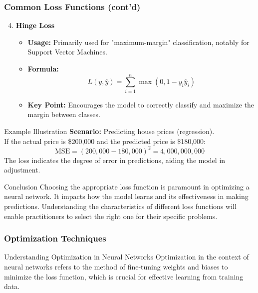 \documentclass[aspectratio=169]{beamer}
\begin{document}
\begin{frame}[fragile]
    \frametitle{Common Loss Functions (cont'd)}
    \begin{enumerate}
        \setcounter{enumi}{3}
        \item \textbf{Hinge Loss}
            \begin{itemize}
                \item \textbf{Usage:} Primarily used for "maximum-margin" classification, notably for Support Vector Machines.
                \item \textbf{Formula:} 
                \begin{equation}
                    L(y, \hat{y}) = \sum_{i=1}^{n} \max(0, 1 - y_i \hat{y}_i)
                \end{equation}
                \item \textbf{Key Point:} Encourages the model to correctly classify and maximize the margin between classes.
            \end{itemize}
    \end{enumerate}

    \begin{block}{Example Illustration}
        \textbf{Scenario:} Predicting house prices (regression).\\
        If the actual price is \$200,000 and the predicted price is \$180,000:
        \begin{equation}
            \text{MSE} = (200,000 - 180,000)^2 = 4,000,000,000
        \end{equation}
        The loss indicates the degree of error in predictions, aiding the model in adjustment.
    \end{block}
    
    \begin{block}{Conclusion}
        Choosing the appropriate loss function is paramount in optimizing a neural network. It impacts how the model learns and its effectiveness in making predictions. Understanding the characteristics of different loss functions will enable practitioners to select the right one for their specific problems.
    \end{block}
\end{frame}

\begin{frame}[fragile]
    \frametitle{Optimization Techniques}
    \begin{block}{Understanding Optimization in Neural Networks}
        Optimization in the context of neural networks refers to the method of fine-tuning weights and biases to minimize the loss function, which is crucial for effective learning from training data.
    \end{block}
\end{frame}
\end{document}
